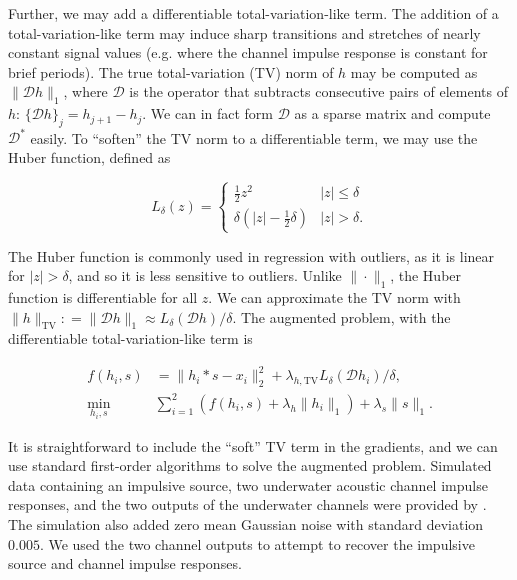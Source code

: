 \documentclass[journal]{IEEEtran}
\newcommand{\defeq}{\mathrel{\mathop:}=}
\begin{document}
\noindent Further, we may add a differentiable total-variation-like term.  The addition of a total-variation-like term may induce sharp transitions and stretches of nearly constant signal values (e.g. where the channel impulse response is constant for brief periods).  The true total-variation (TV) norm of $h$ may be computed as $\|\mathcal{D}h\|_1$, where $\mathcal{D}$ is the operator that subtracts consecutive pairs of elements of $h$: $\{\mathcal{D}h\}_j = h_{j+1} - h_j$.  We can in fact form $\mathcal{D}$ as a sparse matrix and compute $\mathcal{D}^\ast$ easily.  To ``soften'' the TV norm to a differentiable term, we may use the Huber function, defined as

\[ L_\delta(z) = \left\{\begin{array}{ll} \frac{1}{2}z^2 & |z| \le \delta\\ \delta\left(|z| - \frac{1}{2}\delta\right) & |z| > \delta. \end{array}\right. \] 

\noindent The Huber function is commonly used in regression with outliers, as it is linear for $|z|>\delta$, and so it is less sensitive to outliers.  Unlike $\|\cdot\|_1$, the Huber function is differentiable for all $z$.  We can approximate the TV norm with ${\|h\|_\text{TV} \defeq\|\mathcal{D}h\|_1 \approx L_\delta(\mathcal{D}h)/\delta}$.  The augmented problem, with the differentiable total-variation-like term is

\begin{align}
   \label{eq:bce_aug}
   f(h_i,s) &= \|h_i\ast s - x_i\|_2^2 + \lambda_{h,\text{TV}}L_\delta(\mathcal{D}h_i)/\delta,\nonumber\\
   \min_{h_i,s} ~&\sum_{i=1}^2\left(f(h_i,s) + \lambda_h\|h_i\|_1\right) + \lambda_s\|s\|_1.
\end{align}

It is straightforward to include the ``soft'' TV term in the gradients, and we can use standard first-order algorithms to solve the augmented problem.  Simulated data containing an impulsive source, two underwater acoustic channel impulse responses, and the two outputs of the underwater channels were provided by \cite{rideout_2016}.  The simulation also added zero mean Gaussian noise with standard deviation $0.005$.  We used the two channel outputs to attempt to recover the impulsive source and channel impulse responses.\\
\end{document}
